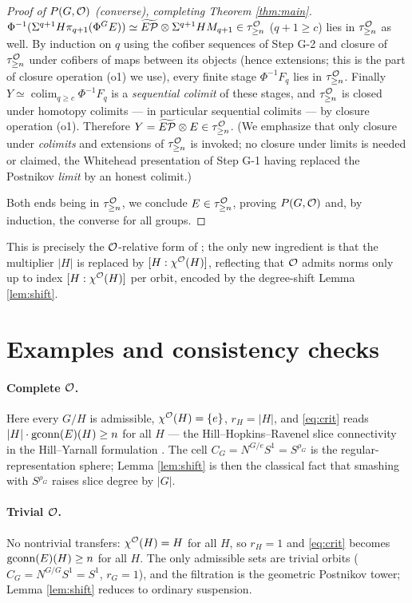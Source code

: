 \begin{proof}[Proof of $P(G,\mathcal{O})$ (converse), completing Theorem \ref{thm:main}]
$\Phi^{-1}(\Sigma^{q+1}H\pi_{q+1}(\Phi^G E))\simeq\widetilde{E\mathcal P}\otimes\Sigma^{q+1}HM_{q+1}
\in\tau^{\mathcal{O}}_{\ge n}$ ($q+1\ge c$) lies in $\tau^{\mathcal{O}}_{\ge n}$ as well. By induction
on $q$ using the cofiber sequences of Step G-2 and closure of $\tau^{\mathcal{O}}_{\ge n}$
under cofibers of maps between its objects (hence extensions; this is the part of
closure operation (o1) we use), every finite stage $\Phi^{-1}F_q$ lies in
$\tau^{\mathcal{O}}_{\ge n}$. Finally $Y\simeq\operatorname*{colim}_{q\ge c}\Phi^{-1}F_q$ is a
\emph{sequential colimit} of these stages, and $\tau^{\mathcal{O}}_{\ge n}$ is closed under
homotopy colimits --- in particular sequential colimits --- by closure operation
(o1). Therefore $Y=\widetilde{E\mathcal P}\otimes E\in\tau^{\mathcal{O}}_{\ge n}$. (We emphasize that only
closure under \emph{colimits} and extensions of $\tau^{\mathcal{O}}_{\ge n}$ is invoked; no
closure under limits is needed or claimed, the Whitehead presentation of Step G-1
having replaced the Postnikov \emph{limit} by an honest colimit.)

Both ends being in $\tau^{\mathcal{O}}_{\ge n}$, we conclude $E\in\tau^{\mathcal{O}}_{\ge n}$, proving
$P(G,\mathcal{O})$ and, by induction, the converse for all groups.
\end{proof}

This is precisely the $\mathcal{O}$-relative form of \cite[Thm.~2.5]{HY18}; the only
new ingredient is that the multiplier $|H|$ is replaced by $[H:\chi^{\mathcal{O}}(H)]$,
reflecting that $\mathcal{O}$ admits norms only up to index $[H:\chi^{\mathcal{O}}(H)]$ per orbit,
encoded by the degree-shift Lemma \ref{lem:shift}.

\section*{Examples and consistency checks}

\paragraph{Complete $\mathcal{O}$.} Here every $G/H$ is admissible, $\chi^{\mathcal{O}}(H)=\{e\}$,
$r_H=|H|$, and \eqref{eq:crit} reads $|H|\cdot\operatorname{gconn}(E)(H)\ge n$ for all
$H$ --- the Hill--Hopkins--Ravenel slice connectivity in the Hill--Yarnall
formulation \cite{HY18, HHR16}. The cell $C_G=N^{G/e}S^1=S^{\rho_G}$ is the
regular-representation sphere; Lemma \ref{lem:shift} is then the classical fact
that smashing with $S^{\rho_G}$ raises slice degree by $|G|$.

\paragraph{Trivial $\mathcal{O}$.} No nontrivial transfers: $\chi^{\mathcal{O}}(H)=H$ for all $H$,
so $r_H=1$ and \eqref{eq:crit} becomes $\operatorname{gconn}(E)(H)\ge n$ for all
$H$. The only admissible sets are trivial orbits ($C_G=N^{G/G}S^1=S^1$,
$r_G=1$), and the filtration is the geometric Postnikov tower; Lemma
\ref{lem:shift} reduces to ordinary suspension.

